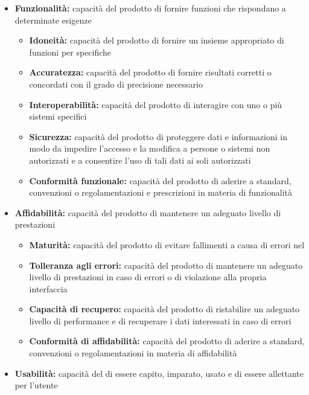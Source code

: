 \documentclass[12pt,a4paper]{article}
\begin{document}
\begin{itemize}
	\item \textbf{Funzionalità:} capacità del prodotto  di fornire funzioni che rispondano a determinate esigenze
	\begin{itemize}
		\item \textbf{Idoneità:} capacità del prodotto  di fornire un insieme appropriato di funzioni per  specifiche
		\item \textbf{Accuratezza:} capacità del prodotto  di fornire risultati corretti o concordati con il grado di precisione necessario
		\item \textbf{Interoperabilità:} capacità del prodotto  di interagire con uno o più sistemi specifici
		\item \textbf{Sicurezza:} capacità del prodotto  di proteggere dati e informazioni in modo da impedire l'accesso e la modifica a persone o sistemi non autorizzati e a consentire l'uso di tali dati ai soli autorizzati
		\item \textbf{Conformità funzionale:} capacità del prodotto  di aderire a standard, convenzioni o regolamentazioni e prescrizioni in materia di funzionalità
	\end{itemize}
	\item \textbf{Affidabilità:} capacità del prodotto  di mantenere un adeguato livello di prestazioni
	\begin{itemize}
		\item \textbf{Maturità:} capacità del prodotto  di evitare fallimenti a causa di errori nel  
		\item \textbf{Tolleranza agli errori: }capacità del prodotto  di mantenere un adeguato livello di prestazioni in caso di errori  o di violazione alla propria interfaccia
		\item \textbf{Capacità di recupero:} capacità del prodotto  di ristabilire un adeguato livello di performance e di recuperare i dati interessati in caso di errori
		\item \textbf{Conformità di affidabilità:} capacità del prodotto  di aderire a standard, convenzioni o regolamentazioni in materia di affidabilità
	\end{itemize}
	\item \textbf{Usabilità:} capacità del  di essere capito, imparato, usato e di essere allettante per l'utente

\end{itemize}
\end{document}
